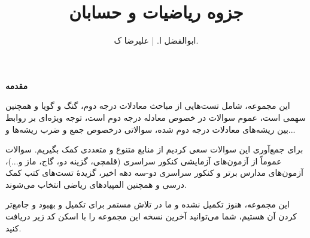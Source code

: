 \documentclass[11pt]{book}
\title{ جزوه ریاضیات و حسابان}
\author{ابوالفضل ا. | علیرضا ک.}
\begin{document}
\maketitle

\thispagestyle{empty}

\bigskip



\begin{center}
	\begin{minipage}{16cm}
{\large 
	\setlength{\parindent}{1.5em}
	
	\textbf{{\huge مقدمه }}\bigskip
	
	\indent
این مجموعه، شامل تست‌هایی از مباحث معادلات درجه دوم، گنگ و گویا و همچنین  سهمی است، عموم سوالات در خصوص معادله درجه دوم است، توجه ویژه‌ای بر روابط بین ریشه‌های معادلات درجه دوم شده، سوالاتی درخصوص جمع و ضرب ریشه‌ها و...

\smallskip

برای جمع‌آوری این سوالات سعی کردیم از منابع متنوع و متعددی کمک بگیریم. سوالات عموماً از آزمون‌های آزمایشی کنکور سراسری (قلمچی، گزینه دو، گاج، ماز و...)، آزمون‌های مدارس برتر و کنکور سراسری دو-سه دهه اخیر، گزیدهٔ تست‌های کتب کمک درسی و همچنین المپیادهای ریاضی انتخاب می‌شوند.

\smallskip \smallskip


این مجموعه، هنوز تکمیل نشده و ما در تلاش مستمر برای تکمیل و بهبود و جامع‌تر کردن‌ آن هستیم، شما می‌توانید آخرین نسخه این مجموعه را با اسکن کد زیر دریافت کنید.
}\end{minipage}
\end{center}






\end{document}
